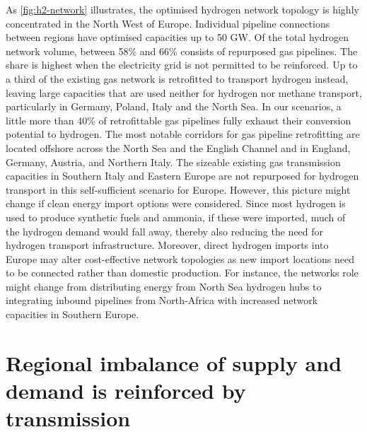 As \cref{fig:h2-network} illustrates, the optimised hydrogen network topology is
highly concentrated in the North West of Europe. Individual pipeline connections
between regions have optimised capacities up to 50 GW. Of the total hydrogen
network volume, between 58\% and 66\% consists of repurposed gas pipelines. The
share is highest when the electricity grid is not permitted to be reinforced. Up
to a third of the existing gas network is retrofitted to transport hydrogen
instead, leaving large capacities that are used neither for hydrogen nor methane
transport, particularly in Germany, Poland, Italy and the North Sea. In our
scenarios, a little more than 40\% of retrofittable gas pipelines fully exhaust
their conversion potential to hydrogen. The most notable corridors for gas
pipeline retrofitting are located offshore across the North Sea and the English
Channel and in England, Germany, Austria, and Northern Italy. The sizeable
existing gas transmission capacities in Southern Italy and Eastern Europe are
not repurposed for hydrogen transport in this self-sufficient scenario for
Europe. However, this picture might change if clean energy import options were
considered. Since most hydrogen is used to produce synthetic fuels and ammonia,
if these were imported, much of the hydrogen demand would fall away, thereby
also reducing the need for hydrogen transport infrastructure. Moreover, direct
hydrogen imports into Europe may alter cost-effective network topologies as new
import locations need to be connected rather than domestic production. For
instance, the networks role might change from distributing energy from North Sea
hydrogen hubs to integrating inbound pipelines from North-Africa with increased
network capacities in Southern Europe.



\section*{Regional imbalance of supply and demand is reinforced by transmission}
\label{sec:imbalance}

